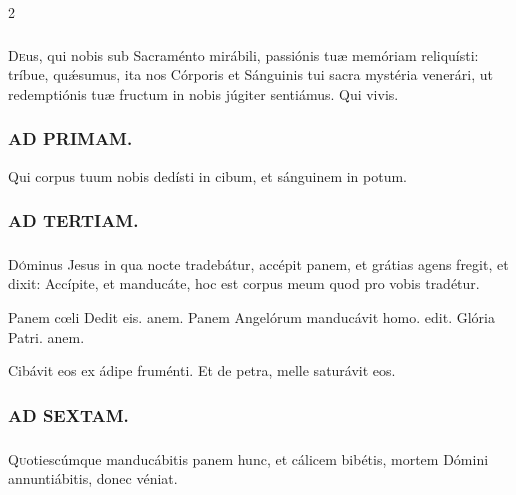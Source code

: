 \documentclass[9pt,twoside]{extarticle}
\begin{document}
\begin{multicols}{2}
\subsubsection*{\center {}}
\lettrine{D}eus, qui nobis sub Sacraménto mirábili, passiónis tuæ memóriam reliquísti: tríbue, quǽsumus, ita nos Córporis et Sánguinis tui sacra mystéria venerári, ut redemptiónis tuæ fructum in nobis júgiter sentiámus. Qui vivis.

\begin{tightlist}{}
\item {}
\end{tightlist}

\subsubsection*{\center \textsc{AD PRIMAM.}}
\noindent {} Qui corpus tuum nobis dedísti in cibum, et sánguinem in potum.

\subsubsection*{\center \textsc{AD TERTIAM.}}
\subsubsection*{}
\lettrine{D}óminus Jesus in qua nocte tradebátur, accépit panem, et grátias agens fregit, et dixit: Accípite, et manducáte, hoc est corpus meum quod pro vobis tradétur.

\begin{tightlist}{}
\item {} Panem cœli \textred{*} Dedit eis. anem.  Panem Angelórum manducávit homo. edit. Glória Patri. anem.
\item {} Cibávit eos ex ádipe fruménti.  Et de petra, melle saturávit eos.
\end{tightlist}

\subsubsection*{\center \textsc{AD SEXTAM.}}
\subsubsection*{}
\lettrine{Q}uotiescúmque manducábitis panem hunc, et cálicem bibétis, mortem Dómini annuntiábitis, donec véniat. 


\end{multicols}
\end{document}
